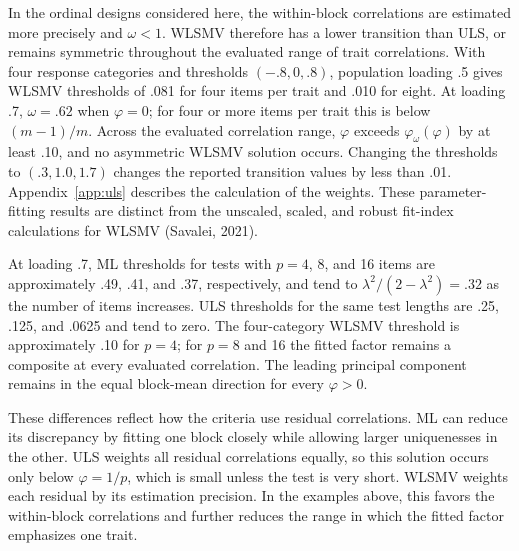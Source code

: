 In the ordinal designs considered here, the within-block correlations are estimated more precisely and $\omega<1$. WLSMV therefore has a lower transition than ULS, or remains symmetric throughout the evaluated range of trait correlations. With four response categories and thresholds $(-.8,0,.8)$, population loading .5 gives WLSMV thresholds of .081 for four items per trait and .010 for eight. At loading .7, $\omega=.62$ when $\varphi=0$; for four or more items per trait this is below $(m-1)/m$. Across the evaluated correlation range, $\varphi$ exceeds $\varphi_\omega(\varphi)$ by at least .10, and no asymmetric WLSMV solution occurs. Changing the thresholds to $(.3,1.0,1.7)$ changes the reported transition values by less than .01. Appendix~\ref{app:uls} describes the calculation of the weights. These parameter-fitting results are distinct from the unscaled, scaled, and robust fit-index calculations for WLSMV (Savalei, 2021).

At loading .7, ML thresholds for tests with $p=4$, 8, and 16 items are approximately .49, .41, and .37, respectively, and tend to $\lambda^2/(2-\lambda^2)=.32$ as the number of items increases. ULS thresholds for the same test lengths are .25, .125, and .0625 and tend to zero. The four-category WLSMV threshold is approximately .10 for $p=4$; for $p=8$ and 16 the fitted factor remains a composite at every evaluated correlation. The leading principal component remains in the equal block-mean direction for every $\varphi>0$.

These differences reflect how the criteria use residual correlations. ML can reduce its discrepancy by fitting one block closely while allowing larger uniquenesses in the other. ULS weights all residual correlations equally, so this solution occurs only below $\varphi=1/p$, which is small unless the test is very short. WLSMV weights each residual by its estimation precision. In the examples above, this favors the within-block correlations and further reduces the range in which the fitted factor emphasizes one trait.
